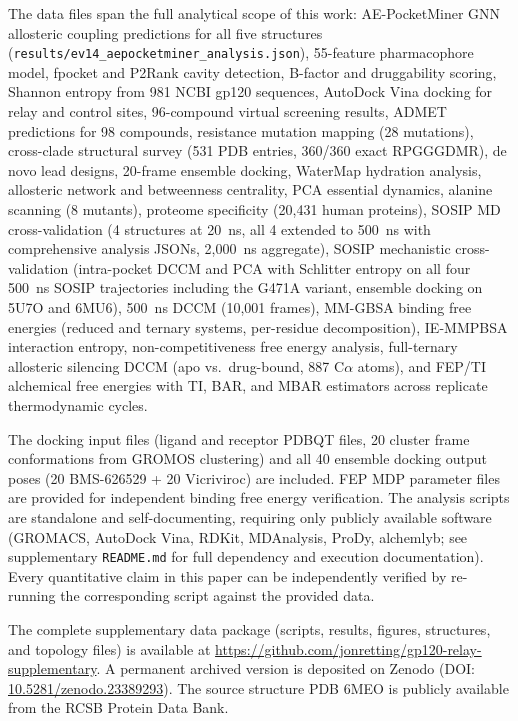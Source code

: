 \documentclass[11pt,a4paper]{article}
\begin{document}
The data files span the full analytical scope of this work: AE-PocketMiner GNN allosteric coupling predictions for all five structures (\texttt{results/ev14\_aepocketminer\_analysis.json}), 55-feature pharmacophore model, fpocket and P2Rank cavity detection, B-factor and druggability scoring, Shannon entropy from 981 NCBI gp120 sequences, AutoDock Vina docking for relay and control sites, 96-compound virtual screening results, ADMET predictions for 98 compounds, resistance mutation mapping (28 mutations), cross-clade structural survey (531 PDB entries, 360/360 exact RPGGGDMR), de novo lead designs, 20-frame ensemble docking, WaterMap hydration analysis, allosteric network and betweenness centrality, PCA essential dynamics, alanine scanning (8 mutants), proteome specificity (20,431 human proteins), SOSIP MD cross-validation (4 structures at 20~ns, all 4 extended to 500~ns with comprehensive analysis JSONs, 2,000~ns aggregate), SOSIP mechanistic cross-validation (intra-pocket DCCM and PCA with Schlitter entropy on all four 500~ns SOSIP trajectories including the G471A variant, ensemble docking on 5U7O and 6MU6), 500~ns DCCM (10,001 frames), MM-GBSA binding free energies (reduced and ternary systems, per-residue decomposition), IE-MMPBSA interaction entropy, non-competitiveness free energy analysis, full-ternary allosteric silencing DCCM (apo vs.\ drug-bound, 887 C$\alpha$ atoms), and FEP/TI alchemical free energies with TI, BAR, and MBAR estimators across replicate thermodynamic cycles.

The docking input files (ligand and receptor PDBQT files, 20 cluster frame conformations from GROMOS clustering) and all 40 ensemble docking output poses (20 BMS-626529 + 20 Vicriviroc) are included. FEP MDP parameter files are provided for independent binding free energy verification. The analysis scripts are standalone and self-documenting, requiring only publicly available software (GROMACS, AutoDock Vina, RDKit, MDAnalysis, ProDy, alchemlyb; see supplementary \texttt{README.md} for full dependency and execution documentation). Every quantitative claim in this paper can be independently verified by re-running the corresponding script against the provided data.

The complete supplementary data package (scripts, results, figures, structures, and topology files) is available at \url{https://github.com/jonretting/gp120-relay-supplementary}. A permanent archived version is deposited on Zenodo (DOI: \href{https://doi.org/10.5281/zenodo.23389293}{10.5281/zenodo.23389293}). The source structure PDB 6MEO is publicly available from the RCSB Protein Data Bank.
\end{document}

